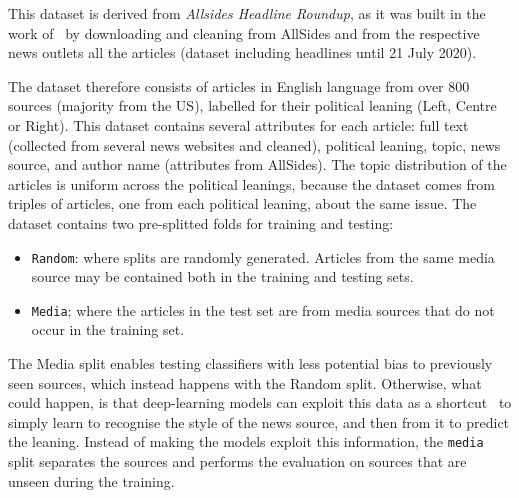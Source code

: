 This dataset is derived from \emph{Allsides Headline Roundup\texttrademark}, as it was built in the work of~\citet{baly2020we} by downloading and cleaning from AllSides and from the respective news outlets all the articles (dataset including headlines until 21 July 2020).

The dataset therefore
consists of articles in English language from over 800 sources (majority from the US), labelled for their political leaning (Left, Centre or Right).
This dataset contains several attributes for each article: full text (collected from several news websites and cleaned), political leaning, topic, news source, and author name (attributes from AllSides).
The topic distribution of the articles is uniform across the political leanings, because the dataset comes from triples of articles, one from each political leaning, about the same issue.
The dataset contains two pre-splitted folds for training and testing:
\begin{itemize}
    \item \texttt{Random}: where splits are randomly generated. Articles from the same media source may be contained both in the training and testing sets.
    \item \texttt{Media}; where the articles in the test set are from media sources that do not occur in the training set. %
\end{itemize}

The Media split enables testing classifiers with less potential bias to previously seen sources, which instead happens with the Random split.
Otherwise, what could happen, is that deep-learning models can exploit this data as a shortcut~\citep{geirhos2020shortcut,baly2020we} to simply learn to recognise the style of the news source, and then from it to predict the leaning.
Instead of making the models exploit this information, the \texttt{media} split separates the sources and performs the evaluation on sources that are unseen during the training.

